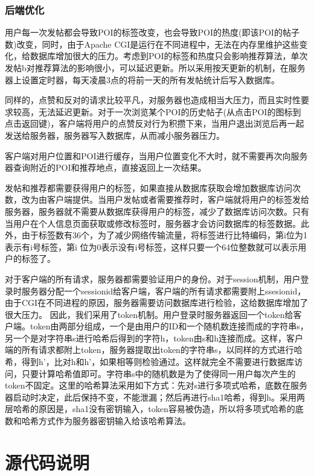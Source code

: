 \documentclass[UTF8]{article}
\begin{document}
\subsubsection{后端优化}
用户每一次发帖都会导致POI的标签改变，也会导致POI的热度(即该POI的帖子数)改变，同时，由于Apache CGI是运行在不同进程中，无法在内存里维护这些变化，给数据库增加很大的压力。考虑到POI的标签和热度只会影响推荐算法，单次发帖b对推荐算法的影响很小，可以延迟更新。所以采用按天更新的机制，在服务器上设置定时器，每天凌晨3点的将前一天的所有发帖统计后写入数据库。

同样的，点赞和反对的请求比较平凡，对服务器也造成相当大压力，而且实时性要求较高，无法延迟更新。对于一次浏览某个POI的历史帖子(从点击POI的图标到点击返回键)，客户端将用户的点赞反对行为积攒下来，当用户退出浏览后再一起发送给服务器，服务器写入数据库，从而减小服务器压力。

客户端对用户位置和POI进行缓存，当用户位置变化不大时，就不需要再次向服务器查询附近的POI和推荐地点，直接返回上一次结果。

发帖和推荐都需要获得用户的标签，如果直接从数据库获取会增加数据库访问次数，改为由客户端提供。当用户发帖或者需要推荐时，客户端就将用户的标签发给服务器，服务器就不需要从数据库获得用户的标签，减少了数据库访问次数。只有当用户在个人信息页面获取或修改标签时，服务器才会访问数据库的标签数据。此外，由于标签数有36个，为了减少网络传输流量，将标签进行比特编码，第i位为1表示有i号标签，第i 位为0表示没有i号标签，这样只要一个64位整数就可以表示用户的标签了。

对于客户端的所有请求，服务器都需要验证用户的身份。对于session机制，用户登录时服务器分配一个sessionid给客户端，客户端的所有请求都需要附上ssesionid，由于CGI在不同进程的原因，服务器需要访问数据库进行检验，这给数据库增加了很大压力。
因此，我们采用了token机制。用户登录时服务器返回一个token给客户端。token由两部分组成，一个是由用户的ID和一个随机数连接而成的字符串s，另一个是对字符串s进行哈希后得到的字符h，token由s和h连接而成。这样，客户端的所有请求都附上token，服务器提取出token的字符串s，以同样的方式进行哈希，得到h'，比对h和h'，如果相等则检验通过。这样就完全不需要进行数据库访问，只要计算哈希值即可。字符串s中的随机数是为了使得同一用户每次产生的token不固定。这里的哈希算法采用如下方式：先对s进行多项式哈希，底数在服务器启动时决定，此后保持不变，不能泄漏；然后再进行sha1哈希，得到h。采用两层哈希的原因是，sha1没有密钥输入，token容易被伪造，所以将多项式哈希的底数和哈希方式作为服务器密钥输入给该哈希算法。

\section{源代码说明}
\end{document}
